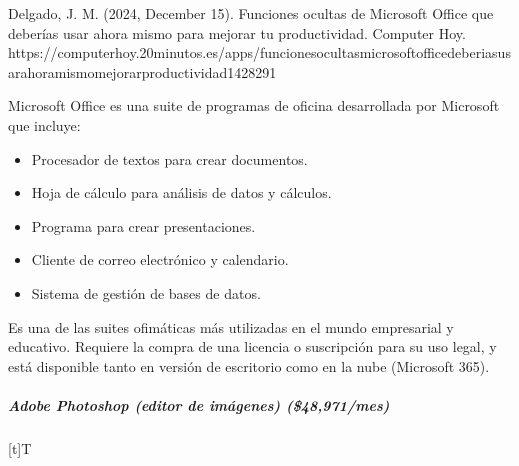 \documentclass[letterpaper,10pt,spanish]{sphinxmanual}
\let\sphinxpxdimen\pdfpxdimen\else\newdimen\sphinxpxdimen
\begin{document}
\sphinxAtStartPar
%
\begin{footnote}[12]\sphinxAtStartFootnote
Delgado, J. M. (2024, December 15). Funciones ocultas de Microsoft Office que deberías usar ahora mismo para mejorar tu productividad. Computer Hoy. https://computerhoy.20minutos.es/apps/funciones\sphinxhyphen{}ocultas\sphinxhyphen{}microsoft\sphinxhyphen{}office\sphinxhyphen{}deberias\sphinxhyphen{}usar\sphinxhyphen{}ahora\sphinxhyphen{}mismo\sphinxhyphen{}mejorar\sphinxhyphen{}productividad\sphinxhyphen{}1428291
%
\end{footnote} Microsoft Office es una suite de programas de oficina desarrollada por Microsoft que incluye:
\begin{itemize}
\item {} 
\sphinxAtStartPar
{} Procesador de textos para crear documentos.

\item {} 
\sphinxAtStartPar
{} Hoja de cálculo para análisis de datos y cálculos.

\item {} 
\sphinxAtStartPar
{} Programa para crear presentaciones.

\item {} 
\sphinxAtStartPar
{} Cliente de correo electrónico y calendario.

\item {} 
\sphinxAtStartPar
{} Sistema de gestión de bases de datos.

\end{itemize}

\sphinxAtStartPar
Es una de las suites ofimáticas más utilizadas en el mundo empresarial y educativo. Requiere la compra de una licencia o suscripción para su uso legal, y está disponible tanto en versión de escritorio como en la nube (Microsoft 365).


\subparagraph{Adobe Photoshop (editor de imágenes) (\$48,971/mes)}
\label{\detokenize{cursos/ofimatica10/recursos/T02:adobe-photoshop-editor-de-imagenes-48-971-mes}}

\begin{savenotes}\sphinxattablestart
\sphinxthistablewithglobalstyle
\centering
\begin{tabulary}{\linewidth}[t]{T}
\sphinxtoprule
\sphinxtableatstartofbodyhook

\begin{sphinxfigure-in-table}
\centering
\capstart
\noindent\sphinxincludegraphics[width=360\sphinxpxdimen]{{image13}.png}
\label{\detokenize{cursos/ofimatica10/recursos/T02:id45}}\end{sphinxfigure-in-table}\relax
\\
\sphinxbottomrule
\end{tabulary}
\sphinxtableafterendhook\par
\sphinxattableend\end{savenotes}
\end{document}
